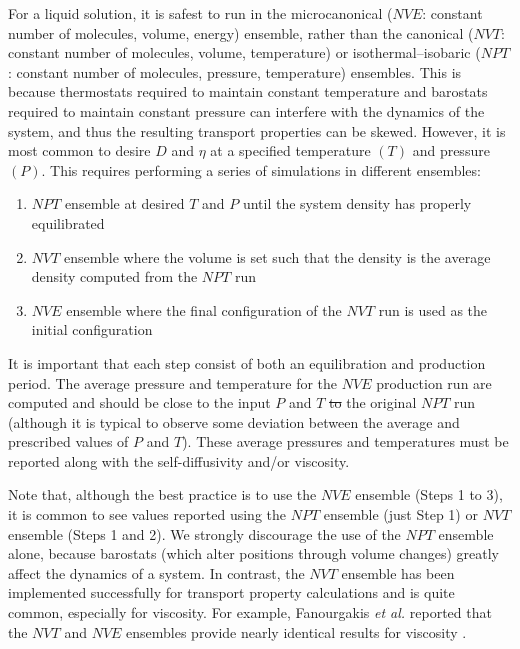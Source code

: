\documentclass[9pt,bestpractices]{livecoms}
\providecommand{\DIFadd}[1]{{\protect\color{blue}\uwave{#1}}} %
\providecommand{\DIFdel}[1]{{\protect\color{red}\sout{#1}}}                      %
\providecommand{\DIFaddbegin}{} %
\providecommand{\DIFaddend}{} %
\providecommand{\DIFdelbegin}{} %
\providecommand{\DIFdelend}{} %
\begin{document}
For a liquid solution, it is safest to run in the microcanonical ($NVE$: constant number of molecules, volume, energy) ensemble, rather than the canonical ($NVT$: constant number of molecules, volume, temperature) or isothermal--isobaric ($NPT$: constant number of molecules, pressure, temperature) ensembles. This is because thermostats required to maintain constant temperature and barostats required to maintain constant pressure can interfere with the dynamics of the system, and thus the resulting transport properties can be skewed. However, it is most common to desire $D$ and $\eta$ at a specified temperature $(T)$ and pressure $(P)$. This requires performing a series of simulations in different ensembles:
\begin{enumerate}
	\item $NPT$ ensemble at desired $T$ and $P$ until the system density has properly equilibrated
	\item $NVT$ ensemble where the volume is set such that the density is the average density computed from the $NPT$ run
	\item $NVE$ ensemble where the final configuration of the $NVT$ run is used as the initial configuration
\end{enumerate}
It is important that each step consist of both an equilibration and production period. The average pressure and temperature for the $NVE$ production run are computed and should be close to the input $P$ and $T$ \DIFdelbegin \DIFdel{to }\DIFdelend \DIFaddbegin \DIFadd{of }\DIFaddend the original $NPT$ run (although it is typical to observe some deviation between the average and prescribed values of $P$ and $T$). These average pressures and temperatures must be reported along with the self-diffusivity and/or viscosity.


Note that, although the best practice is to use the $NVE$ ensemble (Steps 1 to 3), it is common to see values reported using the $NPT$ ensemble (just Step 1) or $NVT$ ensemble (Steps 1 and 2). We strongly discourage the use of the $NPT$ ensemble alone, because barostats (which alter positions through volume changes) greatly affect the dynamics of a system. In contrast, the $NVT$ ensemble has been implemented successfully for transport property calculations and is quite common, especially for viscosity. For example, Fanourgakis \textit{et al.} reported that the $NVT$ and $NVE$ ensembles provide nearly identical results for viscosity \cite{Fanourgakis2012}. 
\DIFaddbegin 
\end{document}
